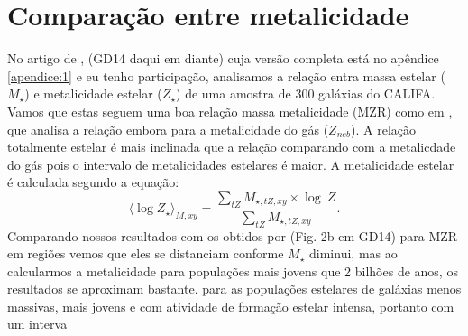 
\section{Comparação entre metalicidade}
\label{sec:synvsneb:Z}

No artigo de \citet{GonzalezDelgado.etal.2014b}, (GD14 daqui em diante) cuja versão completa está no
apêndice \ref{apendice:1} e eu tenho participação, analisamos a relação entra massa estelar ($M_\star$)
e metalicidade estelar ($Z_\star$) de uma amostra de 300 galáxias do CALIFA. Vamos que estas seguem
uma boa relação massa metalicidade (MZR) como em \citet{Tremonti.etal.2004a}, que analisa a relação
embora para a metalicidade do gás ($Z_{neb}$). A relação totalmente estelar é mais inclinada que a
relação comparando com a metalicdade do gás pois o intervalo de metalicidades estelares é maior. A
metalicidade estelar é calculada segundo a equação:
\begin{equation}
 	\label{eq:logZmass}
 	\langle \log Z_\star \rangle_{M,xy} = 
	\frac{ \sum_{tZ} M_{\star,tZ,xy} \times \log\ Z}{
	\sum_{tZ} M_{\star,tZ,xy} }.
\end{equation}
Comparando nossos resultados com os obtidos por \citet{Sanchez.etal.2013a} (Fig. 2b em GD14) para
MZR em regiões \Hii vemos que eles se distanciam conforme $M_\star$ diminui, mas ao calcularmos a
metalicidade para populações mais jovens que 2 bilhões de anos, os resultados se aproximam
bastante. 
para as populações estelares de galáxias menos massivas, mais jovens e com atividade de formação estelar
intensa, portanto com um interva



